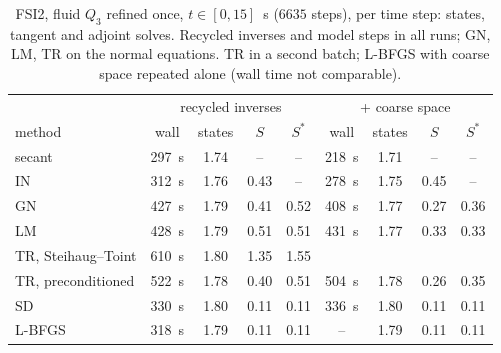 \documentclass[11pt,a4paper]{article}
\theoremstyle{definition}
\theoremstyle{remark}
\begin{document}
\begin{table}[ht]\centering
\caption{FSI2, fluid $Q_3$ refined once, $t\in[0,15]$~s ($6635$ steps), per time step: states,
tangent and adjoint solves. Recycled inverses and model steps in all runs; GN, LM, TR on the normal
equations. TR in a second batch; L-BFGS with coarse space repeated alone (wall time not
comparable).}\label{tab:fsi2_prec}
\begin{tabular}{lcccc|cccc}
\toprule
& \multicolumn{4}{c|}{recycled inverses} & \multicolumn{4}{c}{+ coarse space}\\
method & wall & states & $S$ & $S^*$ & wall & states & $S$ & $S^*$\\
\midrule
secant & 297~s & 1.74 & -- & -- & 218~s & 1.71 & -- & --\\
IN & 312~s & 1.76 & 0.43 & -- & 278~s & 1.75 & 0.45 & --\\
GN & 427~s & 1.79 & 0.41 & 0.52 & 408~s & 1.77 & 0.27 & 0.36\\
LM & 428~s & 1.79 & 0.51 & 0.51 & 431~s & 1.77 & 0.33 & 0.33\\
TR, Steihaug--Toint & 610~s & 1.80 & 1.35 & 1.55 & & & & \\
TR, preconditioned & 522~s & 1.78 & 0.40 & 0.51 & 504~s & 1.78 & 0.26 & 0.35\\
SD & 330~s & 1.80 & 0.11 & 0.11 & 336~s & 1.80 & 0.11 & 0.11\\
L-BFGS & 318~s & 1.79 & 0.11 & 0.11 & -- & 1.79 & 0.11 & 0.11\\
\bottomrule
\end{tabular}
\end{table}
\end{document}
